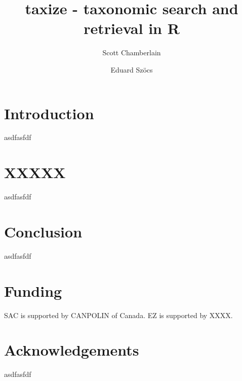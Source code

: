 \documentclass[letterpaper,superscriptaddress,showkeys,longbibliography]{revtex4-1}
\begin{document}
\title{taxize - taxonomic search and retrieval in R}

\author{Scott Chamberlain}

\author{Eduard Sz\"{o}cs}


\maketitle

\section{Introduction}

asdfasfdf

\section{XXXXX}

asdfasfdf

\section{Conclusion}

asdfasfdf

\section{Funding}

SAC is supported by CANPOLIN of Canada. EZ is supported by XXXX.

\section{Acknowledgements}

asdfasfdf

\newpage

\end{document}
